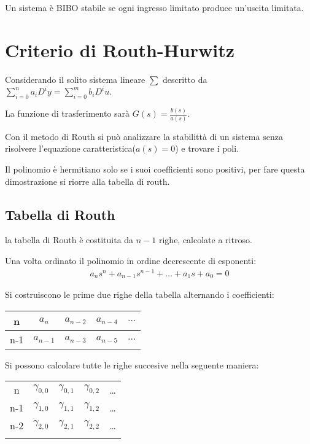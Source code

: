 Un sistema \`e BIBO stabile se ogni ingresso limitato produce un'uscita limitata.

\section{Criterio di Routh-Hurwitz}

Considerando il solito sistema lineare $\sum$ descritto da $\sum_{i=0}^n a_iD^iy = \sum_{i=0}^m b_iD^iu $.

La funzione di trasferimento sar\`a $G(s) = \frac{b(s)}{a(s)}$.


Con il metodo di Routh si pu\`o analizzare la stabilitt\`a di un sistema
senza risolvere l'equazione caratteristica($a(s)=0$) e trovare i poli.


Il polinomio \`e hermitiano solo se i suoi coefficienti sono positivi, per fare questa dimostrazione
si riorre alla tabella di routh.

\subsection{Tabella di Routh}
la tabella di Routh \`e costituita da $n-1$ righe, calcolate a ritroso.

Una volta ordinato il polinomio in ordine decrescente di esponenti:
\begin{align}
  a_n s^n + a_{n-1} s^{n-1} + \dots + a_1 s + a_0 = 0
\end{align}


Si costruiscono le prime due righe della tabella alternando i coefficienti:
\begin{center}
  \begin{tabular}{|c|c|c|c|c|}
    \hline
    n & $a_n$ & $a_{n-2}$ & $a_{n-4}$ & $\dots$ \\
    \hline
    n-1 & $a_{n-1}$ & $a_{n-3}$ & $a_{n-5}$ & $\dots$ \\
    \hline
  \end{tabular}
\end{center}

Si possono calcolare tutte le righe succesive nella seguente maniera:

\begin{center}
  \begin{tabular}{|c|c|c|c|c|}
    \hline
    n & $\gamma_{0,0}$ & $\gamma_{0,1}$ & $\gamma_{0,2}$ & \dots \\
    n-1 & $\gamma_{1,0}$ & $\gamma_{1,1}$ & $\gamma_{1,2}$ & \dots \\
    n-2 & $\gamma_{2,0}$ & $\gamma_{2,1}$ & $\gamma_{2,2}$ & \dots \\
    \dotfill & \dotfill & \dotfill & \dotfill & \dotfill \\
    \hline
  \end{tabular}
\end{center}

